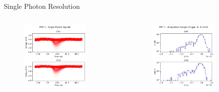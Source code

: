 \begin{frame}{Single Photon Resolution}
    \begin{columns}
        \begin{column}{0.5\textwidth}
            \begin{figure}
                \centering
                \includegraphics[width=0.8\textwidth, frame]{images/single_photon_signals.png}
            \end{figure}
        \end{column}
        \begin{column}{0.5\textwidth}
            \begin{figure}
                \centering
                \includegraphics[width=0.8\textwidth, frame]{images/single_photon_integral_hist.png}
            \end{figure}
        \end{column}
    \end{columns}
\end{frame}


